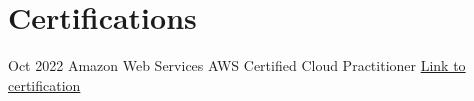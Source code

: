 \section{Certifications}
\cventry
    {Oct 2022}
    {Amazon Web Services}
    {AWS Certified Cloud Practitioner}{}
    {\href{https://www.credly.com/badges/9ac3770a-57b0-4381-adab-17235f1a1743}{Link to certification}}
    {}